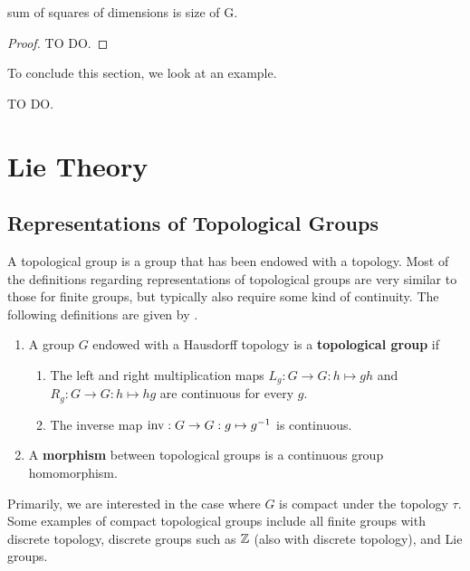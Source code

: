 \documentclass[a4paper]{article}
\begin{document}
\begin{thm}
    sum of squares of dimensions is size of G.
\end{thm}

\begin{proof}
    TO DO.
\end{proof}

To conclude this section, we look at an example.

\begin{eg}
    TO DO.
\end{eg}

\section{Lie Theory}
\subsection{Representations of Topological Groups}
A topological group is a group that has been endowed with a topology. Most of the definitions regarding representations of topological groups are very similar to those for finite groups, but typically also require some kind of continuity. 
The following definitions are given by \cite{alex}.

\begin{defi}\end{defi}
\begin{enumerate}
    \item A group $G$ endowed with a Hausdorff topology is a \textbf{topological group} if 
    \begin{enumerate}
        \item The left and right multiplication maps $L_g : G \to G : h \mapsto gh$ and $R_g : G \to G : h \mapsto hg$ are continuous for every $g$.
        \item The inverse map $\operatorname{inv}: G \to G : g \mapsto g^{-1}$  is continuous.
    \end{enumerate}
    \item A \textbf{morphism} between topological groups is a continuous group homomorphism.
\end{enumerate}

Primarily, we are interested in the case where $G$ is compact under the topology $\tau$. Some examples of compact topological groups include all finite groups with discrete topology, discrete groups such as $\mathbb{Z}$ (also with discrete topology), and Lie groups. 
\end{document}

